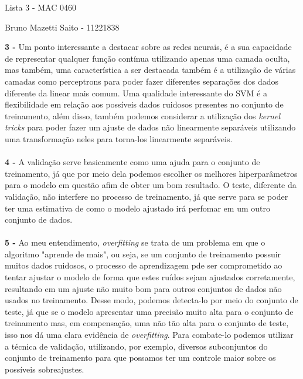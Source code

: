 \documentclass[10pt,a4paper]{article}
\begin{document}
\begin{center}
	Lista 3 - MAC 0460
	
	Bruno Mazetti Saito - 11221838
\end{center}

\textbf{3 - } Um ponto interessante a destacar sobre as redes neurais, é a sua capacidade de representar qualquer função contínua utilizando apenas uma camada oculta, mas também, uma característica a ser destacada também é a utilização de várias camadas como perceptrons para poder fazer diferentes separações dos dados diferente da linear mais comum. Uma qualidade interessante do SVM é a flexibilidade em relação aos possíveis dados ruidosos presentes no conjunto de treinamento, além disso, também podemos considerar a utilização dos \textit{kernel tricks} para poder fazer um ajuste de dados não linearmente separáveis utilizando uma transformação neles para torna-los linearmente separáveis. \\ \\

\textbf{4 - } A validação serve basicamente como uma ajuda para o conjunto de treinamento, já que por meio dela podemos escolher os melhores hiperparâmetros para o modelo em questão afim de obter um bom resultado. O teste, diferente da validação, não interfere no processo de treinamento, já que serve para se poder ter uma estimativa de como o modelo ajustado irá perfomar em um outro conjunto de dados. \\ \\

\textbf{5 - } Ao meu entendimento, \textit{overfitting} se trata de um problema em que o algoritmo "aprende de mais", ou seja, se um conjunto de treinamento possuir muitos dados ruidosos, o processo de aprendizagem pde ser comprometido ao tentar ajustar o modelo de forma que estes ruídos sejam ajustados corretamente, resultando em um ajuste não muito bom para outros conjuntos de dados não usados no treinamento. Desse modo, podemos detecta-lo por meio do conjunto de teste, já que se o modelo apresentar uma precisão muito alta para o conjunto de treinamento mas, em compensação, uma não tão alta para o conjunto de teste, isso nos dá uma clara evidência de \textit{overfitting}. Para combate-lo podemos utilizar a técnica de validação, utilizando, por exemplo, diversos subconjuntos do conjunto de treinamento para que possamos ter um controle maior sobre os possíveis sobreajustes. \\ \\
\end{document}
